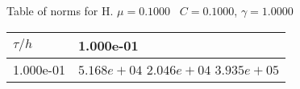 \begin{center}
Table of norms for H. $\mu = 0.1000$ \, $C = 0.1000$, $\gamma = 1.0000$
  
\begin{tabular}{|p{1in}|p{1in}|} \hline
$\tau / h$ &1.000e-01 \\ \hline 
1.000e-01 & $5.168e+04$  $2.046e+04$  $3.935e+05$  \\ \hline 

\end{tabular}\\[20pt]
\end{center}
